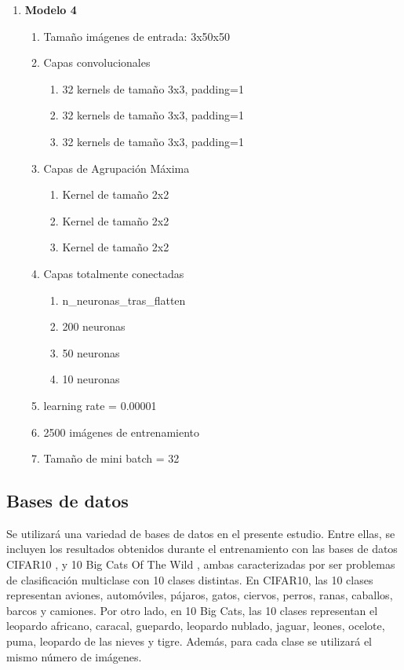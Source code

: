 \begin{enumerate}
	\item \textbf{Modelo 4}
	\begin{enumerate}[label=\textbullet, nosep]
		\item Tamaño imágenes de entrada: 3x50x50
		\item Capas convolucionales
		\begin{enumerate}[label=\textbullet, nosep]
			\item 32 kernels de tamaño 3x3, padding=1
			\item 32 kernels de tamaño 3x3, padding=1
			\item 32 kernels de tamaño 3x3, padding=1
		\end{enumerate}
		\item Capas de Agrupación Máxima
		\begin{enumerate}[label=\textbullet, nosep]
			\item Kernel de tamaño 2x2
			\item Kernel de tamaño 2x2
			\item Kernel de tamaño 2x2
		\end{enumerate}
		\item Capas totalmente conectadas
		\begin{enumerate}[label=\textbullet, nosep]
			\item n\_neuronas\_tras\_flatten
			\item 200 neuronas
			\item 50 neuronas
			\item 10 neuronas
		\end{enumerate}
		\item learning rate = 0.00001
		\item 2500 imágenes de entrenamiento
		\item Tamaño de mini batch = 32
	\end{enumerate}		

	
\end{enumerate}

\subsection{Bases de datos}

Se utilizará una variedad de bases de datos en el presente estudio. Entre ellas, se incluyen los resultados obtenidos durante el entrenamiento con las bases de datos CIFAR10 \cite{cifar10}, y 10 Big Cats Of The Wild \cite{10_big_cats}, ambas caracterizadas por ser problemas de clasificación multiclase con 10 clases distintas. En CIFAR10, las 10 clases representan aviones, automóviles, pájaros, gatos, ciervos, perros, ranas, caballos, barcos y camiones. Por otro lado, en 10 Big Cats, las 10 clases representan el leopardo africano, caracal, guepardo, leopardo nublado, jaguar, leones, ocelote, puma, leopardo de las nieves y tigre. Además, para cada clase se utilizará el mismo número de imágenes.

